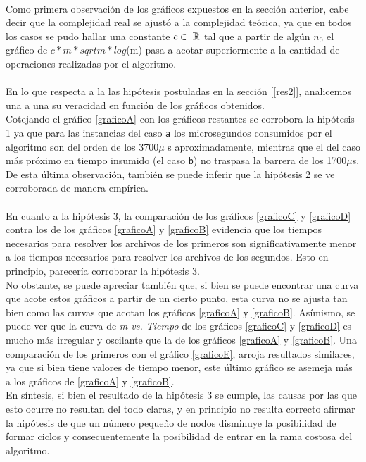 \paragraph{}
Como primera observación de los gráficos expuestos en la sección anterior, cabe decir que la complejidad real se ajustó a la complejidad teórica, ya que en todos los casos se pudo hallar una constante $c \in\ \mathbb{R}$ tal que a partir de algún $n_0$ el gráfico de $c*m*sqrt{m}*log$(m) pasa a acotar superiormente a la cantidad de operaciones realizadas por el algoritmo.

\paragraph{}
En lo que respecta a la las hipótesis postuladas en la sección [\ref{res2}], analicemos una a una su veracidad en función de los gráficos obtenidos.\\
Cotejando el gráfico \ref{graficoA} con los gráficos restantes se corrobora la hipótesis 1 ya que para las instancias del caso \texttt{a} los microsegundos consumidos por el algoritmo son del orden de los 3700$\mu$ s aproximadamente, mientras que el del caso más próximo en tiempo insumido (el caso \texttt{b}) no traspasa la barrera de los 1700$\mu$s.\\
De esta última observación, también se puede inferir que la hipótesis 2 se ve corroborada de manera empírica.

\paragraph{}
En cuanto a la hipótesis 3, la comparación de los gráficos \ref{graficoC} y \ref{graficoD} contra los de los gráficos \ref{graficoA} y \ref{graficoB} evidencia que los tiempos necesarios para resolver los archivos de los primeros son significativamente menor a los tiempos necesarios para resolver los archivos de los segundos. Esto en principio, parecería corroborar la hipótesis 3.\\
No obstante, se puede apreciar también que, si bien se puede encontrar una curva que acote estos gráficos a partir de un cierto punto, esta curva no se ajusta tan bien como las curvas que acotan los gráficos \ref{graficoA} y \ref{graficoB}. Asímismo, se puede ver que la curva de \textit{m vs. Tiempo} de los gráficos \ref{graficoC} y \ref{graficoD} es mucho más irregular y oscilante que la de los gráficos \ref{graficoA} y \ref{graficoB}. Una comparación de los primeros con el gráfico \ref{graficoE}, arroja resultados similares, ya que si bien tiene valores de tiempo menor, este último gráfico se asemeja más a los gráficos de \ref{graficoA} y \ref{graficoB}.\\
En síntesis, si bien el resultado de la hipótesis 3 se cumple, las causas por las que esto ocurre no resultan del todo claras, y en principio no resulta correcto afirmar la hipótesis de que un número pequeño de nodos disminuye la posibilidad de formar ciclos y consecuentemente la posibilidad de entrar en la rama costosa del algoritmo.


